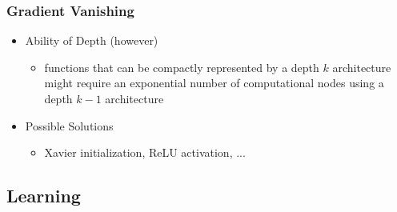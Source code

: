 \subsubsection{Gradient Vanishing}
\begin{itemize}
\item Ability of Depth (however)
	\begin{itemize}
	\item functions that can be compactly represented by a depth $k$ architecture might require an exponential number of computational nodes using a depth $k-1$ architecture
	\end{itemize}
	
\item Possible Solutions
	\begin{itemize}
	\item Xavier initialization, ReLU activation, ...
	\end{itemize}	
\end{itemize}

\subsection{Learning}
